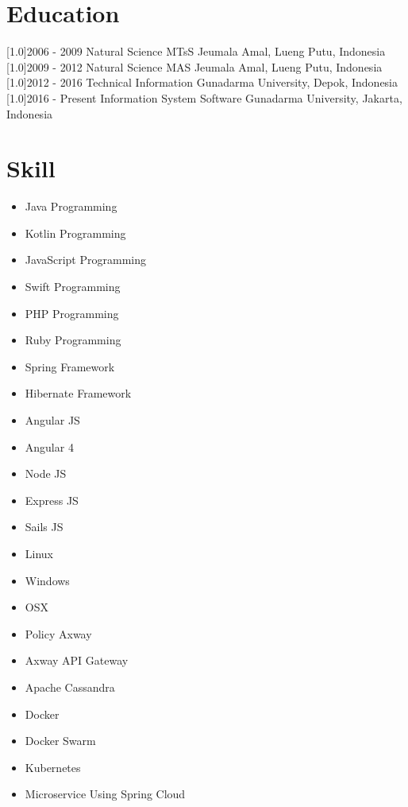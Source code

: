 \documentclass[english]{cv-style}
\begin{document}
\section{Education}
  \vspace{-0.3cm}
\begin{entrylist}
\entry
{\scalebox{.8}[1.0]{2006 - 2009}}
{Natural Science}
{MTsS Jeumala Amal, Lueng Putu, Indonesia}
{}
\entry
{\scalebox{.8}[1.0]{2009 - 2012}}
{Natural Science}
{MAS Jeumala Amal, Lueng Putu, Indonesia}
{}
\entry
{\scalebox{.8}[1.0]{2012 - 2016}}
{Technical Information}
{Gunadarma University, Depok, Indonesia}
{}
\entry
{\scalebox{.8}[1.0]{2016 - Present}}
{Information System Software}
{Gunadarma University, Jakarta, Indonesia}
{}
\end{entrylist}
\vspace{-0.3cm}

\section{Skill}
\vspace{-0.3cm}
\begin{itemize}
\item Java Programming
\item Kotlin Programming
\item JavaScript Programming
\item Swift Programming
\item PHP Programming
\item Ruby Programming
\item Spring Framework
\item Hibernate Framework
\item Angular JS
\item Angular 4
\item Node JS
\item Express JS
\item Sails JS
\item Linux
\item Windows
\item OSX
\item Policy Axway
\item Axway API Gateway
\item Apache Cassandra
\item Docker
\item Docker Swarm
\item Kubernetes
\item Microservice Using Spring Cloud
\end{itemize}
\end{document}
